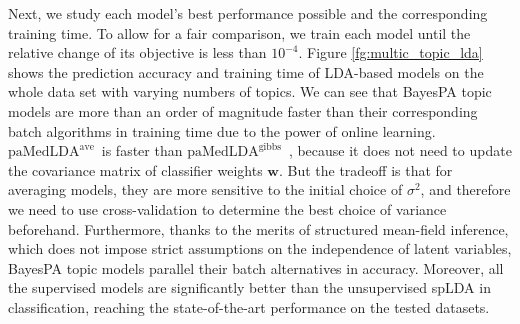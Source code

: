 \documentclass[twoside,11pt]{article}
\newcommand{\wv}{\bm{w}}
\newcommand\paMedLDAave{$\text{paMedLDA}^{\text{ave}}$~}
\newcommand\paMedLDAgibbs{$\text{paMedLDA}^{\text{gibbs}}$~}
\begin{document}
Next, we study each model's best performance possible and the corresponding training time.
To allow for a fair comparison, we train each model until the relative change of  its objective is less than $10^{-4}$.
 Figure \ref{fg:multic_topic_lda} shows the prediction accuracy and training time of LDA-based models on the whole data set with varying numbers of topics. We can see that BayesPA topic models are more than an order of magnitude faster than their corresponding batch algorithms in training time due to the power of online learning. \paMedLDAave is faster than \paMedLDAgibbs, because it does not need to update the covariance matrix of classifier weights $\wv$. But the tradeoff is that for averaging models, they are more sensitive to the initial choice of $\sigma^2$, and therefore we need to use cross-validation to determine the best choice of variance beforehand.
Furthermore, thanks to the merits of structured mean-field inference, which does not impose strict assumptions on the independence of latent variables, BayesPA topic models parallel their batch alternatives in accuracy. Moreover, all the supervised models are significantly better than the unsupervised spLDA in classification, reaching the state-of-the-art performance on the tested datasets.
\end{document}

